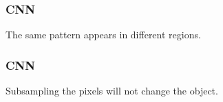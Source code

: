 \documentclass{beamer}
\begin{document}
\begin{frame}
	\frametitle{CNN}
The same pattern appears in different regions.
	
	\begin{figure}
		\hfill
		\hfill
		\hfill
	\end{figure}
	
\end{frame}

\begin{frame}
	\frametitle{CNN}
	Subsampling the pixels will not change the object.
	
	\begin{figure}
		\hfill
		\hfill
		\hfill
	\end{figure}
	
\end{frame}
\end{document}
